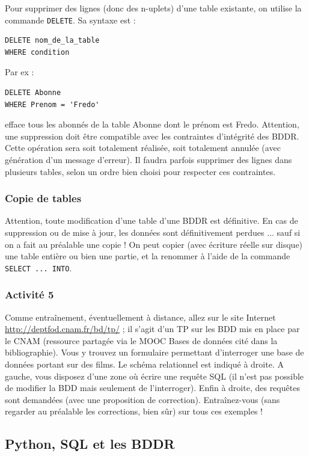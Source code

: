 \documentclass[11pt,a4paper,french,twoside]{PMCours}
\begin{document}
Pour supprimer des lignes (donc des n-uplets) d'une table existante, on utilise la commande \verb'DELETE'. Sa syntaxe est :
\begin{verbatim}
DELETE nom_de_la_table 
WHERE condition
\end{verbatim}
Par ex : 
\begin{verbatim}
DELETE Abonne 
WHERE Prenom = 'Fredo'
\end{verbatim}
efface tous les abonnés de la table Abonne dont le prénom est Fredo. Attention, une suppression doit être compatible avec les contraintes d'intégrité des BDDR. Cette opération sera soit totalement réalisée, soit totalement annulée (avec génération d'un message d'erreur). Il faudra parfois supprimer des lignes dans plusieurs tables, selon un ordre bien choisi pour respecter ces contraintes.


\subsubsection*{Copie de tables}

Attention, toute modification d'une table d'une BDDR est définitive.  En cas de suppression ou de mise à jour, les données sont définitivement perdues ... sauf si on a fait au préalable une copie ! On peut copier (avec écriture réelle sur disque) une table entière ou bien une partie, et la renommer à l'aide de la commande \verb'SELECT ... INTO'.


\subsubsection*{Activité 5}

Comme entraînement, éventuellement à distance, allez sur le site Internet \url{http://deptfod.cnam.fr/bd/tp/} ; il s'agit d'un TP sur les BDD mis en place par le CNAM (ressource partagée via le MOOC Bases de données cité dans la bibliographie). Vous y trouvez un formulaire permettant d'interroger une base de données portant sur des films. Le schéma relationnel est indiqué à droite. A gauche, vous disposez d'une zone où écrire une requête SQL (il n'est pas possible de modifier la BDD mais seulement de l'interroger). Enfin à droite, des requêtes sont demandées (avec une proposition de correction). Entraînez-vous (sans regarder au préalable les corrections, bien sûr) sur tous ces exemples !


\subsection{Python, SQL et les BDDR}
\end{document}
